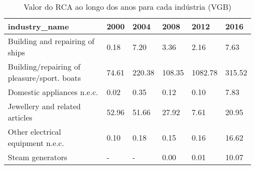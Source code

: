 \begin{table}
\centering
\caption{Valor do RCA ao longo dos anos para cada indústria (VGB)}
\begin{tabular}{p{6cm}p{1.5cm}p{1.5cm}p{1.5cm}p{1.5cm}p{1.5cm}}
\toprule
                              industry\_name &  2000 &   2004 &   2008 &    2012 &   2016 \\
\midrule
            Building and repairing of ships &  0.18 &   7.20 &   3.36 &    2.16 &   7.63 \\
Building/repairing of pleasure/sport. boats & 74.61 & 220.38 & 108.35 & 1082.78 & 315.52 \\
                 Domestic appliances n.e.c. &  0.02 &   0.35 &   0.12 &    0.10 &   7.83 \\
             Jewellery and related articles & 52.96 &  51.66 &  27.92 &    7.61 &  20.95 \\
          Other electrical equipment n.e.c. &  0.10 &   0.18 &   0.15 &    0.16 &  16.62 \\
                           Steam generators &     - &      - &   0.00 &    0.01 &  10.07 \\
\bottomrule
\end{tabular}
\end{table}
